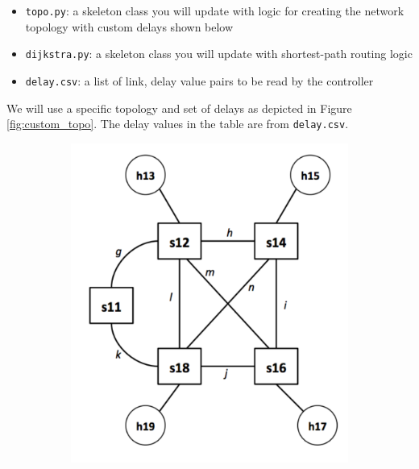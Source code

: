 \documentclass{article}
\begin{document}
\begin{itemize}
    \item \texttt{topo.py}: a skeleton class you will update with logic for creating the network topology with custom delays shown below
    \item \texttt{dijkstra.py}: a skeleton class you will update with shortest-path routing logic
    \item \texttt{delay.csv}: a list of link, delay value pairs to be read by the controller
\end{itemize}
We will use a specific topology and set of delays as depicted in Figure \ref{fig:custom_topo}. The delay values in the table are from \texttt{delay.csv}.

\begin{figure}[H]
     \centering
     \begin{subfigure}[c]{0.6\textwidth}
         \centering
         \includegraphics[width=\textwidth]{img/delay_topo.png}


\end{subfigure}
\end{figure}
\end{document}
